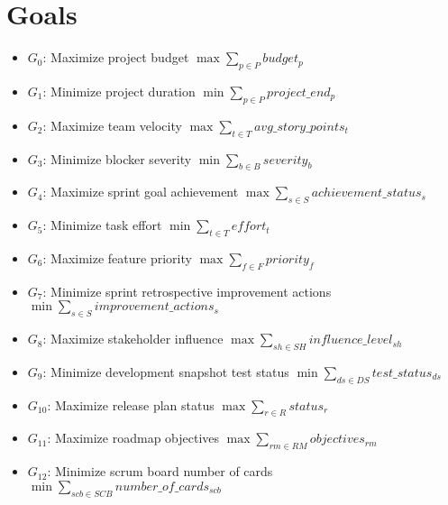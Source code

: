 \documentclass{article}
\begin{document}
\section{Goals}
\begin{itemize}
    \item $G_0$: Maximize project budget $\max \sum_{p \in P} budget_p$
    \item $G_1$: Minimize project duration $\min \sum_{p \in P} project\_end_p$
    \item $G_2$: Maximize team velocity $\max \sum_{t \in T} avg\_story\_points_t$
    \item $G_3$: Minimize blocker severity $\min \sum_{b \in B} severity_b$
    \item $G_4$: Maximize sprint goal achievement $\max \sum_{s \in S} achievement\_status_s$
    \item $G_5$: Minimize task effort $\min \sum_{t \in T} effort_t$
    \item $G_6$: Maximize feature priority $\max \sum_{f \in F} priority_f$
    \item $G_7$: Minimize sprint retrospective improvement actions $\min \sum_{s \in S} improvement\_actions_s$
    \item $G_8$: Maximize stakeholder influence $\max \sum_{sh \in SH} influence\_level_{sh}$
    \item $G_9$: Minimize development snapshot test status $\min \sum_{ds \in DS} test\_status_{ds}$
    \item $G_{10}$: Maximize release plan status $\max \sum_{r \in R} status_r$
    \item $G_{11}$: Maximize roadmap objectives $\max \sum_{rm \in RM} objectives_{rm}$
    \item $G_{12}$: Minimize scrum board number of cards $\min \sum_{scb \in SCB} number\_of\_cards_{scb}$
\end{itemize}
\end{document}
